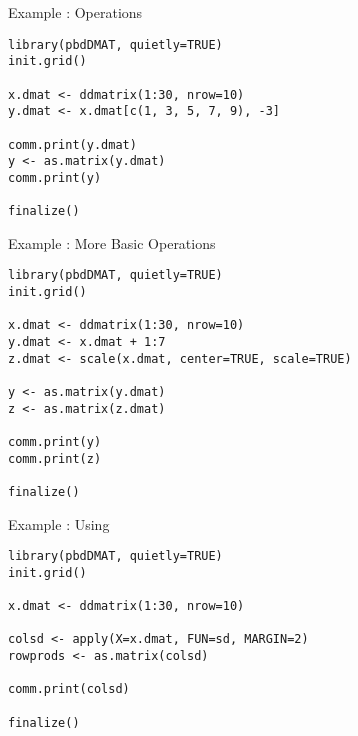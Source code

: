 \begin{frame}[fragile]
  \begin{exampleblock}{Example \countex:   Operations}\pause
\begin{lstlisting}[title=Generate locally only what is needed]
library(pbdDMAT, quietly=TRUE)
init.grid()

x.dmat <- ddmatrix(1:30, nrow=10)
y.dmat <- x.dmat[c(1, 3, 5, 7, 9), -3]

comm.print(y.dmat)
y <- as.matrix(y.dmat)
comm.print(y)

finalize()
\end{lstlisting}
% 
  \end{exampleblock}
\end{frame}



\begin{frame}[fragile]
  \begin{exampleblock}{Example \countex:  More Basic Operations}\pause
\begin{lstlisting}
library(pbdDMAT, quietly=TRUE)
init.grid()

x.dmat <- ddmatrix(1:30, nrow=10)
y.dmat <- x.dmat + 1:7
z.dmat <- scale(x.dmat, center=TRUE, scale=TRUE)

y <- as.matrix(y.dmat)
z <- as.matrix(z.dmat)

comm.print(y)
comm.print(z)

finalize()
\end{lstlisting}
  \end{exampleblock}
\end{frame}



\begin{frame}[fragile]
  \begin{exampleblock}{Example \countex:  Using }\pause
\begin{lstlisting}
library(pbdDMAT, quietly=TRUE)
init.grid()

x.dmat <- ddmatrix(1:30, nrow=10)

colsd <- apply(X=x.dmat, FUN=sd, MARGIN=2)
rowprods <- as.matrix(colsd)

comm.print(colsd)

finalize()
\end{lstlisting}
  \end{exampleblock}
\end{frame}

